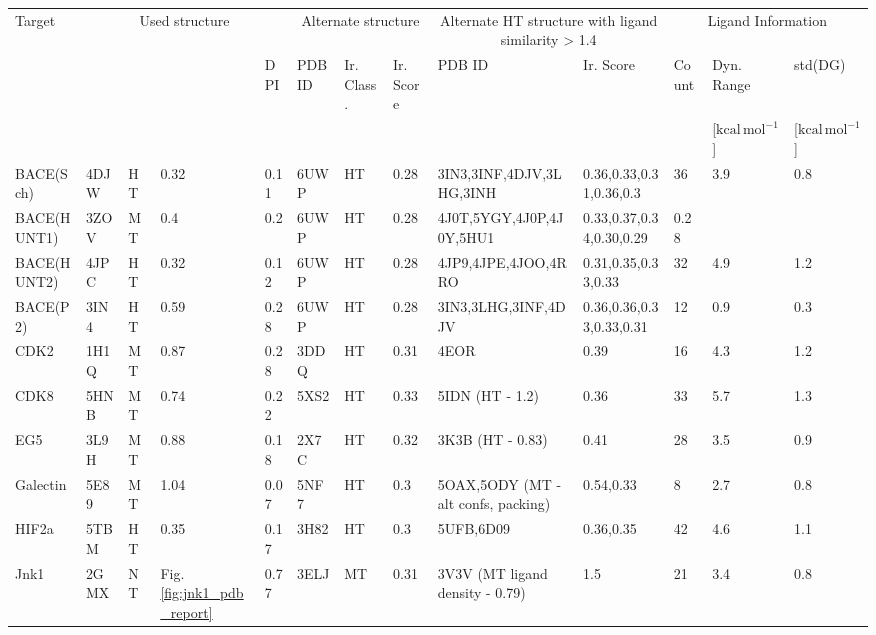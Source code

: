 \begin{tabular}{l|l@{ (}l@{ - }l@{) }l|lll|ll|lll}
Target     & \multicolumn{4}{c|}{Used structure}                          & \multicolumn{3}{c|}{Alternate structure}  & \multicolumn{2}{c|}{Alternate HT structure with ligand similarity > 1.4} & \multicolumn{3}{c}{Ligand Information}\\
           & & & & DPI  & PDB ID & Ir. Class. &  Ir. Score & PDB ID  &  Ir. Score & Count & Dyn. Range  & std(DG)\\
           &            &           &           &       &       &               &          &               &     &      & [$\mathrm{kcal\,mol^{-1}}$] & [$\mathrm{kcal\,mol^{-1}}$] \\ 
\hline
BACE(Sch)   & 4DJW        & HT                     & 0.32          & 0.11 & 6UWP& HT & 0.28& 3IN3,3INF,4DJV,3LHG,3INH & 0.36,0.33,0.31,0.36,0.3  & 36 & 3.9 & 0.8\\
BACE(HUNT1) & 3ZOV        & MT                     & 0.4           & 0.2  & 6UWP& HT & 0.28 & 4J0T,5YGY,4J0P,4J0Y,5HU1 & 0.33,0.37,0.34,0.30,0.29 & 0.28 \\
BACE(HUNT2) & 4JPC        & HT                     & 0.32          & 0.12 & 6UWP& HT & 0.28& 4JP9,4JPE,4JOO,4RRO	   & 0.31,0.35,0.33,0.33            & 32 & 4.9 & 1.2\\
BACE(P2)    & 3IN4        & HT                     & 0.59          & 0.28 & 6UWP& HT & 0.28& 3IN3,3LHG,3INF,4DJV	& 0.36,0.36,0.33,0.33,0.31 & 12 & 0.9 & 0.3\\
CDK2       & 1H1Q        & MT                     & 0.87          & 0.28 & 3DDQ& HT& 0.31 & 4EOR &	0.39 & 16 & 4.3 & 1.2\\
CDK8       & 5HNB        & MT                     & 0.74          & 0.22 & 5XS2& HT& 0.33 & 5IDN (HT - 1.2) &	0.36 & 33 & 5.7 & 1.3\\
EG5        & 3L9H        & MT                     & 0.88          & 0.18 & 2X7C& HT& 0.32 & 3K3B (HT - 0.83) &	0.41 & 28 & 3.5 & 0.9\\
Galectin   & 5E89        & MT                     & 1.04          & 0.07 & 5NF7& HT& 0.3 &5OAX,5ODY (MT - alt confs, packing)	& 0.54,0.33  & 8 & 2.7 & 0.8\\ 
HIF2a      & 5TBM        & HT                     & 0.35          & 0.17 & 3H82& HT& 0.3 & 5UFB,6D09 &	0.36,0.35   & 42 & 4.6 & 1.1 \\ 
Jnk1       & 2GMX        & NT                     & Fig. \ref{fig:jnk1_pdb_report}     & 0.77 & 3ELJ& MT& 0.31  & 3V3V (MT ligand density - 0.79) & 1.5 & 21 & 3.4 & 0.8\\

\end{tabular}
